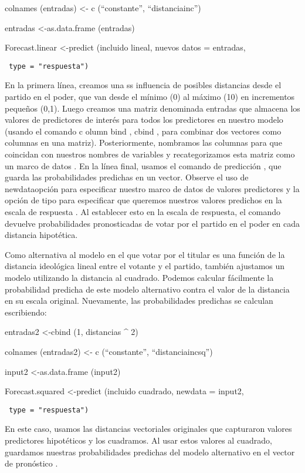 \documentclass[
]{book}
\begin{document}
colnames (entradas) \textless- c (``constante'', ``distanciainc'')

entradas \textless-as.data.frame (entradas)

Forecast.linear \textless-predict (incluido lineal, nuevos datos = entradas,

\begin{verbatim}
 type = "respuesta")
\end{verbatim}

En la primera línea, creamos una ss influencia de posibles distancias desde el partido en el poder, que van desde el mínimo (0) al máximo (10) en incrementos pequeños (0,1). Luego creamos una matriz denominada entradas que almacena los valores de predictores de interés para todos los predictores en nuestro modelo (usando el comando c olumn bind , cbind , para combinar dos vectores como columnas en una matriz). Posteriormente, nombramos las columnas para que coincidan con nuestros nombres de variables y recategorizamos esta matriz como un marco de datos . En la línea final, usamos el comando de predicción , que guarda las probabilidades predichas en un vector. Observe el uso de newdataopción para especificar nuestro marco de datos de valores predictores y la opción de tipo para especificar que queremos nuestros valores predichos en la escala de respuesta . Al establecer esto en la escala de respuesta, el comando devuelve probabilidades pronosticadas de votar por el partido en el poder en cada distancia hipotética.

Como alternativa al modelo en el que votar por el titular es una función de la distancia ideológica lineal entre el votante y el partido, también ajustamos un modelo utilizando la distancia al cuadrado. Podemos calcular fácilmente la probabilidad predicha de este modelo alternativo contra el valor de la distancia en su escala original. Nuevamente, las probabilidades predichas se calculan escribiendo:

entradas2 \textless-cbind (1, distancias \^{} 2)

colnames (entradas2) \textless- c (``constante'', ``distanciaincsq'')

input2 \textless-as.data.frame (input2)

Forecast.squared \textless-predict (incluido cuadrado, newdata = input2,

\begin{verbatim}
 type = "respuesta")
\end{verbatim}

En este caso, usamos las distancias vectoriales originales que capturaron valores predictores hipotéticos y los cuadramos. Al usar estos valores al cuadrado, guardamos nuestras probabilidades predichas del modelo alternativo en el vector de pronóstico .
\end{document}
